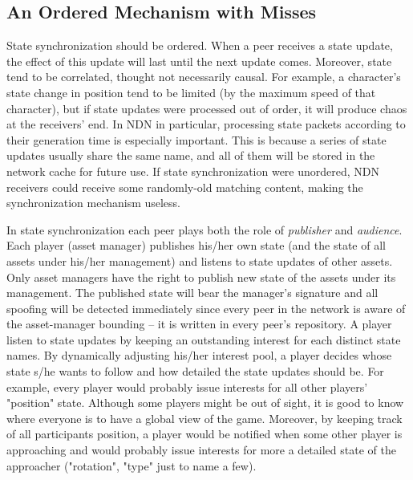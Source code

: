 \subsection{An Ordered Mechanism with Misses}
\label{orderedmiss}
State synchronization should be ordered. When a peer receives a state update, the effect of this update will last until the next update comes. Moreover, state tend to be correlated, thought not necessarily causal. For example, a character's state change in position tend to be limited (by the maximum speed of that character), but if state updates were processed out of order, it will produce chaos at the receivers' end. In NDN in particular, processing state packets according to their generation time is especially important. This is because a series of state updates usually share the same name, and all of them will be stored in the network cache for future use. If state synchronization were unordered, NDN receivers could receive some randomly-old matching content, making the synchronization mechanism useless.

In state synchronization each peer plays both the role of \emph{publisher} and \emph{audience}. Each player (asset manager) publishes his/her own state (and the state of all assets under his/her management) and listens to state updates of other assets. Only asset managers have the right to publish new state of the assets under its management. The published state will bear the manager's signature and all spoofing will be detected immediately since every peer in the network is aware of the asset-manager bounding -- it is written in every peer's repository. A player listen to state updates by keeping an outstanding interest for each distinct state names. By dynamically adjusting his/her interest pool, a player decides whose state s/he wants to follow and how detailed the state updates should be. For example, every player would probably issue interests for all other players' "{position}" state. Although some players might be out of sight, it is good to know where everyone is to have a global view of the game. Moreover, by keeping track of all participants position, a player would be notified when some other player is approaching and would probably issue interests for more a detailed state of the approacher ("{rotation}", "{type}" just to name a few).

